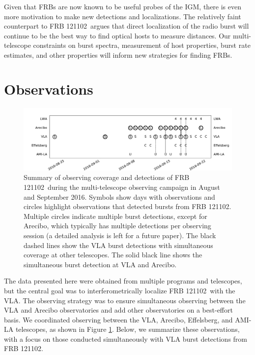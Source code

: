 \documentclass[twocolumn]{aastex61}
\newcommand{\frb}{FRB 121102}
\begin{document}
Given that FRBs are now known to be useful probes of the IGM, there is even more motivation to make new detections and localizations. The relatively faint counterpart to \frb\ argues that direct localization of the radio burst will continue to be the best way to find optical hosts to measure distances. Our multi-telescope constraints on burst spectra, measurement of host properties, burst rate estimates, and other properties will inform new strategies for finding FRBs.

\section{Observations}

\begin{figure}[t]
\begin{center}
\includegraphics[width=2\columnwidth]{timeline}
\caption{Summary of observing coverage and detections of \frb\ during the multi-telescope observing campaign in August and September 2016. Symbols show days with observations and circles highlight observations that detected bursts from \frb. Multiple circles indicate multiple burst detections, except for Arecibo, which typically has multiple detections per observing session (a detailed analysis is left for a future paper). The black dashed lines show the VLA burst detections with simultaneous coverage at other telescopes. The solid black line shows the simultaneous burst detection at VLA and Arecibo.
\label{fig:multi}}
\end{center}
\end{figure}

The data presented here were obtained from multiple programs and telescopes, but the central goal was to interferometrically localize \frb\ with the VLA. The observing strategy was to ensure simultaneous observing between the VLA and Arecibo observatories and add other observatories on a best-effort basis. We coordinated observing between the VLA, Arecibo, Effelsberg, and AMI-LA telescopes, as shown in Figure \ref{fig:multi}. Below, we summarize these observations, with a focus on those conducted simultaneously with VLA burst detections from \frb.
\end{document}
